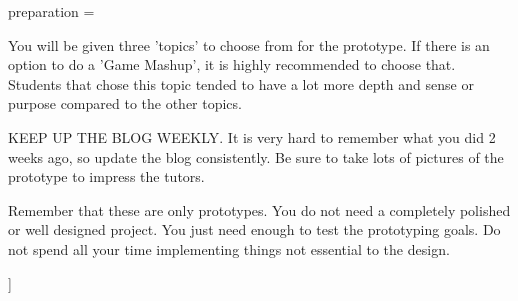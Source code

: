 preparation = {
    \item You will be given three 'topics' to choose from for the prototype. If there is an option to do a 'Game Mashup', it is highly recommended to choose that. Students that chose this topic tended to have a lot more depth and sense or purpose compared to the other topics.
    \item KEEP UP THE BLOG WEEKLY. It is very hard to remember what you did 2 weeks ago, so update the blog consistently. Be sure to take lots of pictures of the prototype to impress the tutors.
    \item Remember that these are only prototypes. You do not need a completely polished or well designed project. You just need enough to test the prototyping goals. Do not spend all your time implementing things not essential to the design.
}]{}
